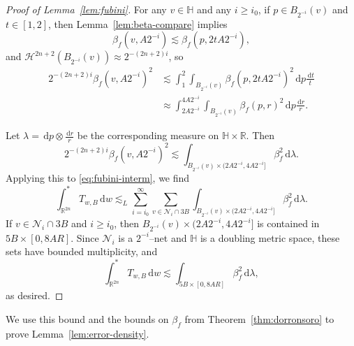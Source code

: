 \documentclass[12pt,reqno]{amsart}
\newcommand{\cH}{\mathcal{H}}
\newcommand{\cN}{\mathcal{N}}
\newcommand{\HH}{\mathbb{H}}
\newcommand{\R}{\mathbb{R}}
\newcommand{\ud}[0]{\,\mathrm{d}}
\theoremstyle{remark}
\newcommand{\0}{\mathbf{0}}
\renewcommand{\1}{\mathbf 1}
\begin{document}
\begin{proof}[Proof of Lemma~\ref{lem:fubini}]
  For any $v\in \HH$ and any $i\ge i_0$, if $p \in B_{2^{-i}}(v)$ and $t\in [1,2]$, then Lemma~\ref{lem:beta-compare} implies
  $$\beta_f(v, A 2^{-i}) \lesssim \beta_f(p, 2 t A 2^{-i}),$$
  and $\cH^{2n+2}(B_{2^{-i}}(v)) \approx 2^{-(2n+2)i}$,
  so
  \[
  \begin{aligned}
    2^{-(2n+2)i} \beta_f(v, A 2^{-i})^2 & 
    \lesssim 
    \int_1^2 \int_{B_{2^{-i}}(v)} \beta_f(p, 2 t A 2^{-i})^2 \ud p \frac{\ud t}{t} \\
    &\approx \int_{2 A 2^{-i}}^{4 A 2^{-i}} \int_{B_{2^{-i}}(v)} \beta_f(p, r)^2 \ud p \frac{\ud r}{r}.
    \end{aligned}
  \]
  
  Let $\lambda = \ud p \otimes \frac{\ud r}{r}$ be the corresponding measure on $\HH\times \R$. Then 
  $$2^{-(2n+2)i} \beta_f(v, A 2^{-i})^2 \lesssim \int_{B_{2^{-i}}(v)\times (2 A 2^{-i}, 4 A 2^{-i}]} \beta_f^2 \ud \lambda.$$
  Applying this to \eqref{eq:fubini-interm}, we find
  $$\int^*_{\R^{2n}} T_{w,B} \ud w \lesssim_L \sum_{i=i_0}^\infty \sum_{v\in \cN_i\cap 3B} \int_{B_{2^{-i}}(v)\times (2 A 2^{-i}, 4 A 2^{-i}]} \beta_f^2 \ud \lambda.$$
  If $v\in \cN_i\cap 3B$ and $i\ge i_0$, then $B_{2^{-i}}(v)\times (2 A 2^{-i}, 4 A 2^{-i}]$ is contained in $5B\times [0, 8AR]$. Since $\cN_i$ is a $2^{-i}$--net and $\HH$ is a doubling metric space, these sets have bounded multiplicity, and
  $$\int^*_{\R^{2n}} T_{w,B} \ud w \lesssim \int_{5B \times [0, 8 AR]} \beta_f^2\ud \lambda,$$
  as desired.
\end{proof}

We use this bound and the bounds on $\beta_f$ from Theorem~\ref{thm:dorronsoro} to prove Lemma~\ref{lem:error-density}.
\end{document}
